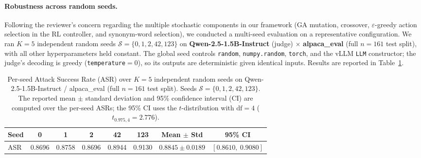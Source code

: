 
\paragraph{Robustness across random seeds.}
Following the reviewer's concern regarding the multiple stochastic components
in our framework (GA mutation, crossover, $\varepsilon$-greedy action selection
in the RL controller, and synonym-word selection), we conducted a multi-seed
evaluation on a representative configuration. We ran $K{=}5$ independent
random seeds $\mathcal{S} = \{0, 1, 2, 42, 123\}$ on
\textbf{Qwen-2.5-1.5B-Instruct} (judge) $\times$ \textbf{alpaca\_eval}
(full $n{=}161$ test split), with all other hyperparameters held constant.
The global seed controls
\texttt{random}, \texttt{numpy.random}, \texttt{torch}, and the vLLM
\texttt{LLM} constructor; the judge's decoding is greedy
(\texttt{temperature}$=0$), so its outputs are deterministic given identical
inputs. Results are reported in Table~\ref{tab:multiseed}.

\begin{table}[t]
  \centering
  \caption{Per-seed Attack Success Rate (ASR) over $K{=}5$ independent random
  seeds on Qwen-2.5-1.5B-Instruct / alpaca\_eval (full $n{=}161$ test split).
  Seeds $\mathcal{S}=\{0,1,2,42,123\}$.
  The reported mean $\pm$ standard deviation and 95\% confidence interval
  (CI) are computed over the per-seed ASRs; the 95\% CI uses the
  $t$-distribution with $\text{df}{=}4$ ($t_{0.975,4}{=}2.776$).}
  \label{tab:multiseed}
  \small
  \begin{tabular}{lccccc|cc}
    \toprule
    \textbf{Seed} & 0 & 1 & 2 & 42 & 123 & \textbf{Mean $\pm$ Std} & \textbf{95\% CI} \\
    \midrule
    ASR           & 0.8696 & 0.8758 & 0.8696 & 0.8944 & 0.9130 & $0.8845 \pm 0.0189$ & $[0.8610,\ 0.9080]$ \\
    \bottomrule
  \end{tabular}
\end{table}

